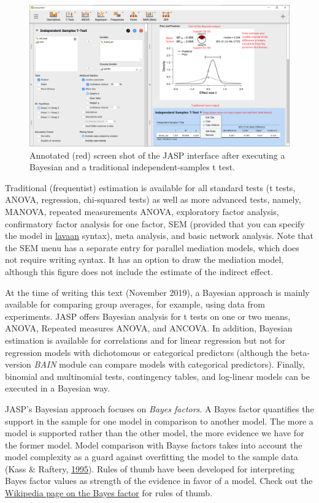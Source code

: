 \documentclass[doc]{apa6}
\begin{document}
\begin{figure}[H]
\includegraphics[width=1\linewidth]{JASP} \caption{Annotated (red) screen shot of the JASP interface after executing a Bayesian and a traditional independent-samples t test.}\label{fig:JASPscreenshot}
\end{figure}

Traditional (frequentist) estimation is available for all standard tests
(t tests, ANOVA, regression, chi-squared tests) as well as more advanced
tests, namely, MANOVA, repeated measurements ANOVA, exploratory factor
analysis, confirmatory factor analysis for one factor, SEM (provided
that you can specify the model in \href{http://lavaan.ugent.be/}{lavaan}
syntax), meta analysis, and basic network analysis. Note that the SEM
menu has a separate entry for parallel mediation models, which does not
require writing syntax. It has an option to draw the mediation model,
although this figure does not include the estimate of the indirect
effect.

At the time of writing this text (November 2019), a Bayesian approach is
mainly available for comparing group averages, for example, using data
from experiments. JASP offers Bayesian analysis for t tests on one or
two means, ANOVA, Repeated measures ANOVA, and ANCOVA. In addition,
Bayesian estimation is available for correlations and for linear
regression but not for regression models with dichotomous or categorical
predictors (although the beta-version \emph{BAIN} module can compare
models with categorical predictors). Finally, binomial and multinomial
tests, contingency tables, and log-linear models can be executed in a
Bayesian way.

JASP's Bayesian approach focuses on \emph{Bayes factors}. A Bayes factor
quantifies the support in the sample for one model in comparison to
another model. The more a model is supported rather than the other
model, the more evidence we have for the former model. Model comparison
with Bayse factors takes into account the model complexity as a guard
against overfitting the model to the sample data (Kass \& Raftery,
\protect\hyperlink{ref-kassBayesFactors1995}{1995}). Rules of thumb have
been developed for interpreting Bayes factor values as strength of the
evidence in favor of a model. Check out the
\href{https://en.wikipedia.org/wiki/Bayes_factor\#Interpretation}{Wikipedia
page on the Bayes factor} for rules of thumb.
\end{document}
